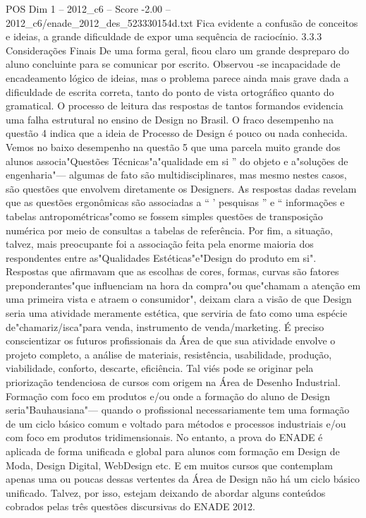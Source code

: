 \begin{textsample}{POS Dim 1 – 2012\_c6 – Score -2.00 – 2012\_c6/enade\_2012\_des\_523330154d.txt}
Fica evidente a confusão de conceitos e ideias, a grande dificuldade de expor uma sequência de raciocínio. 3.3.3 Considerações Finais De uma forma geral, ficou claro um grande despreparo do aluno concluinte para se comunicar por escrito.
Observou -se incapacidade de encadeamento lógico de ideias, mas o problema parece ainda mais grave dada a dificuldade de escrita correta, tanto do ponto de vista ortográfico quanto do gramatical.
O processo de leitura das respostas de tantos formandos evidencia uma falha estrutural no ensino de Design no Brasil.
O fraco desempenho na questão 4 indica que a ideia de Processo de Design é pouco ou nada conhecida.
Vemos no baixo desempenho na questão 5 que uma parcela muito grande dos alunos associa"Questões Técnicas"a"qualidade em si ” do objeto e a"soluções de engenharia"— algumas de fato são multidisciplinares, mas mesmo nestes casos, são questões que envolvem diretamente os Designers.
As respostas dadas revelam que as questões ergonômicas são associadas a “ ' pesquisas ” e “ informações e tabelas antropométricas"como se fossem simples questões de transposição numérica por meio de consultas a tabelas de referência.
Por fim, a situação, talvez, mais preocupante foi a associação feita pela enorme maioria dos respondentes entre as"Qualidades Estéticas"e"Design do produto em si".
Respostas que afirmavam que as escolhas de cores, formas, curvas são fatores preponderantes"que influenciam na hora da compra"ou que"chamam a atenção em uma primeira vista e atraem o consumidor", deixam clara a visão de que Design seria uma atividade meramente estética, que serviria de fato como uma espécie de"chamariz/isca"para venda, instrumento de venda/marketing.
É preciso conscientizar os futuros profissionais da Área de que sua atividade envolve o projeto completo, a análise de materiais, resistência, usabilidade, produção, viabilidade, conforto, descarte, eficiência.
Tal viés pode se originar pela priorização tendenciosa de cursos com origem na Área de Desenho Industrial.
Formação com foco em produtos e/ou onde a formação do aluno de Design seria"Bauhausiana"— quando o profissional necessariamente tem uma formação de um ciclo básico comum e voltado para métodos e processos industriais e/ou com foco em produtos tridimensionais.
No entanto, a prova do ENADE é aplicada de forma unificada e global para alunos com formação em Design de Moda, Design Digital, WebDesign etc.
E em muitos cursos que contemplam apenas uma ou poucas dessas vertentes da Área de Design não há um ciclo básico unificado.
Talvez, por isso, estejam deixando de abordar alguns conteúdos cobrados pelas três questões discursivas do ENADE 2012.

\end{textsample}
